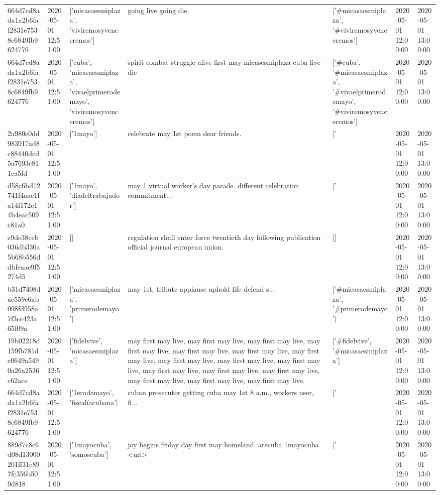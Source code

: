 \begin{tabular}{lllllll}
664d7cd8ada1a2b6faf2831e7538c6849fb9624776 & 2020-05-01 12:51:00 & ['micasaesmiplaza', 'viviremosyvenceremos'] & going live going die. & ['#micasaesmiplaza', '#viviremosyvenceremos'] & 2020-05-01 12:00:00 & 2020-05-01 13:00:00 \\
664d7cd8ada1a2b6faf2831e7538c6849fb9624776 & 2020-05-01 12:51:00 & ['cuba', 'micasaesmiplaza', 'vivaelprimerodemayo', 'viviremosyvenceremos'] & spirit combat struggle alive first may micasesmiplaza cuba live die & ['#cuba', '#micasaesmiplaza', '#vivaelprimerodemayo', '#viviremosyvenceremos'] & 2020-05-01 12:00:00 & 2020-05-01 13:00:00 \\
2a980e0dd983917ad8c88440dcd5a7693c811ca5fd & 2020-05-01 12:51:00 & ['1mayo'] & celebrate may 1st poem dear friends. & ['#1mayo'] & 2020-05-01 12:00:00 & 2020-05-01 13:00:00 \\
d58c6bd12741f4aae1fa14f172c14b4eac509c81a0 & 2020-05-01 12:51:00 & ['1mayo', 'díadeltrabajador'] & may 1 virtual worker's day parade. different celebration commitment... & ['#1mayo', '#díadeltrabajador'] & 2020-05-01 12:00:00 & 2020-05-01 13:00:00 \\
e9de38ceb036db330a5b68b556ddbfeaae9f5274d5 & 2020-05-01 12:51:00 & [] & regulation shall enter force twentieth day following publication official journal european union. & [] & 2020-05-01 12:00:00 & 2020-05-01 13:00:00 \\
b31d7408dac559c6ab098fd958a7f3cc423a65f09a & 2020-05-01 12:51:00 & ['micasaesmiplaza', 'primerodemayo'] & may 1st, tribute applause uphold life defend s... & ['#micasaesmiplaza', '#primerodemayo'] & 2020-05-01 12:00:00 & 2020-05-01 13:00:00 \\
19b02218d159fb781dc0649a5490a26a2536c62ace & 2020-05-01 12:51:00 & ['fidelvive', 'micasaesmiplaza'] & may first may live, may first may live, may first may live, may first may live, may first may live, may first may live, may first may live, may first may live, may first may live, may first may live, may first may live, may first may live, may first may live, may first may live, may first may live, may first may live. & ['#fidelvive', '#micasaesmiplaza'] & 2020-05-01 12:00:00 & 2020-05-01 13:00:00 \\
664d7cd8ada1a2b6faf2831e7538c6849fb9624776 & 2020-05-01 12:51:00 & ['1erodemayo', 'fiscalíacubana'] & cuban prosecutor getting cuba may 1st 8 a.m., workers user, fi... & ['#1erodemayo'] & 2020-05-01 12:00:00 & 2020-05-01 13:00:00 \\
889d7c8c6d08d13000201ff31c897fc356b509d818 & 2020-05-01 12:51:00 & ['1mayocuba', 'somoscuba'] & joy begins friday day first may homeland. arecuba 1mayocuba <url> & ['#1mayocuba', '#somoscuba'] & 2020-05-01 12:00:00 & 2020-05-01 13:00:00 \\

\end{tabular}
